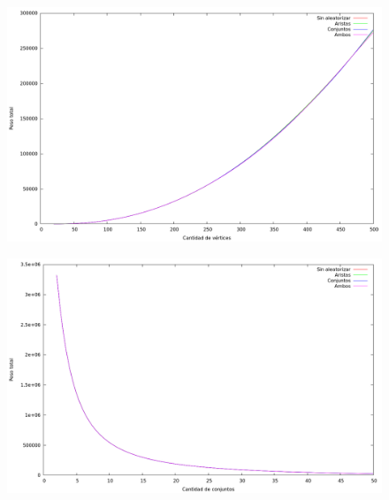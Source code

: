 \vspace*{0.5cm}

\vspace*{0.5cm}

\begin{figure}[H]
  \begin{center}
    \includegraphics[scale=0.35]{imagenes/grasp-local-n-peso.png}
  \end{center}
\end{figure}

\vspace*{0.5cm}

\vspace*{0.5cm}

\begin{figure}[H]
  \begin{center}
    \includegraphics[scale=0.35]{imagenes/grasp-local-k-peso.png}
  \end{center}
\end{figure}

